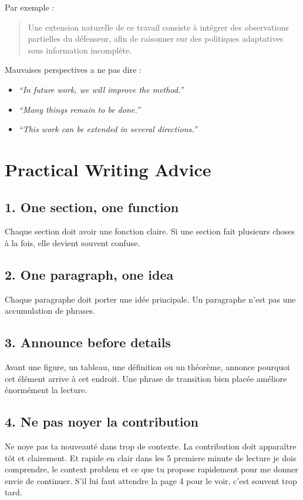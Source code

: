 \documentclass[11pt,a4paper]{article}
\theoremstyle{definition}
\begin{document}
Par exemple :
\begin{quote}
Une extension naturelle de ce travail consiste à intégrer des observations partielles du défenseur, afin de raisonner sur des politiques adaptatives sous information incomplète.
\end{quote}

Mauvaises perspectives a ne pas dire :
\begin{itemize}
    \item \textit{``In future work, we will improve the method.''}
    \item \textit{``Many things remain to be done.''}
    \item \textit{``This work can be extended in several directions.''}
\end{itemize}


\section{Practical Writing Advice}

\subsection*{1. One section, one function}

Chaque section doit avoir une fonction claire. Si une section fait plusieurs choses à la fois, elle devient souvent confuse.

\subsection*{2. One paragraph, one idea}

Chaque paragraphe doit porter une idée principale. Un paragraphe n'est pas une accumulation de phrases.

\subsection*{3. Announce before details}

Avant une figure, un tableau, une définition ou un théorème, annonce pourquoi cet élément arrive à cet endroit. Une phrase de transition bien placée améliore énormément la lecture.

\subsection*{4. Ne pas noyer la contribution}

Ne noye pas ta nouveauté dans trop de contexte. La contribution doit apparaître tôt et clairement. Et rapide en clair dans les 5 premiere minute de lecture je dois comprendre, le context problem et ce que tu propose rapidement pour me donner envie de continuer. S'il lui faut attendre la page 4 pour le voir, c'est souvent trop tard.
\end{document}
